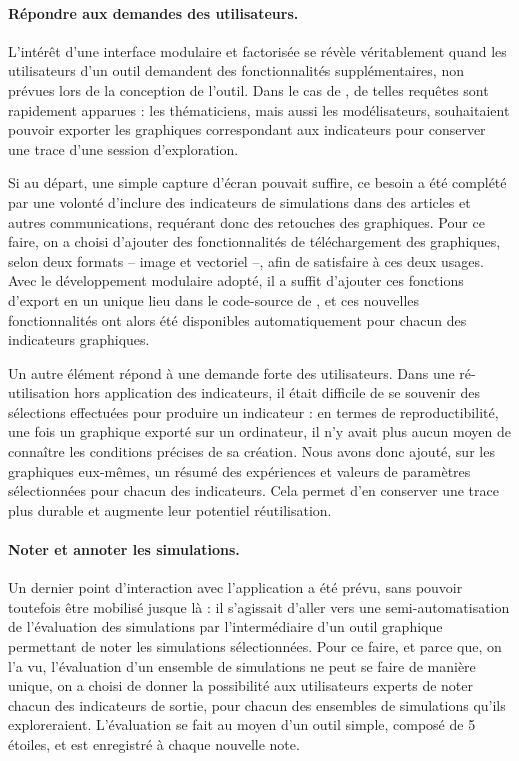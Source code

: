 \paragraph{Répondre aux demandes des utilisateurs.}

L'intérêt d'une interface modulaire et factorisée se révèle véritablement quand les utilisateurs d'un outil demandent des fonctionnalités supplémentaires, non prévues lors de la conception de l'outil.
Dans le cas de \simfeodal{}, de telles requêtes sont rapidement apparues : les thématiciens, mais aussi les modélisateurs, souhaitaient pouvoir exporter les graphiques correspondant aux indicateurs pour conserver une trace d'une session d'exploration.

Si au départ, une simple capture d'écran pouvait suffire, ce besoin a été complété par une volonté d'inclure des indicateurs de simulations dans des articles et autres communications, requérant donc des retouches des graphiques.
Pour ce faire, on a choisi d'ajouter des fonctionnalités de téléchargement des graphiques, selon deux formats -- image et vectoriel --, afin de satisfaire à ces deux usages.
Avec le développement modulaire adopté, il a suffit d'ajouter ces fonctions d'export en un unique lieu dans le code-source de \simedb{}, et ces nouvelles fonctionnalités ont alors été disponibles automatiquement pour chacun des indicateurs graphiques.

Un autre élément répond à une demande forte des utilisateurs.
Dans une ré-utilisation hors application des indicateurs, il était difficile de se souvenir des sélections effectuées pour produire un indicateur : en termes de reproductibilité, une fois un graphique exporté sur un ordinateur, il n'y avait plus aucun moyen de connaître les conditions précises de sa création.
Nous avons donc ajouté, sur les graphiques eux-mêmes, un résumé des expériences et valeurs de paramètres sélectionnées pour chacun des indicateurs.
Cela permet d'en conserver une trace plus durable et augmente leur potentiel réutilisation.

\paragraph{Noter et annoter les simulations.}\label{par:noter-simul}

Un dernier point d'interaction avec l'application a été prévu, sans pouvoir toutefois être mobilisé jusque là : il s'agissait d'aller vers une semi-automatisation de l'évaluation des simulations par l'intermédiaire d'un outil graphique permettant de \og noter\fg{} les simulations sélectionnées.
Pour ce faire, et parce que, on l'a vu, l'évaluation d'un ensemble de simulations ne peut se faire de manière unique, on a choisi de donner la possibilité aux utilisateurs experts de noter chacun des indicateurs de sortie, pour chacun des ensembles de simulations qu'ils exploreraient.
L'évaluation se fait au moyen d'un outil simple, composé de 5 \og étoiles\fg{}, et est enregistré à chaque nouvelle note.

